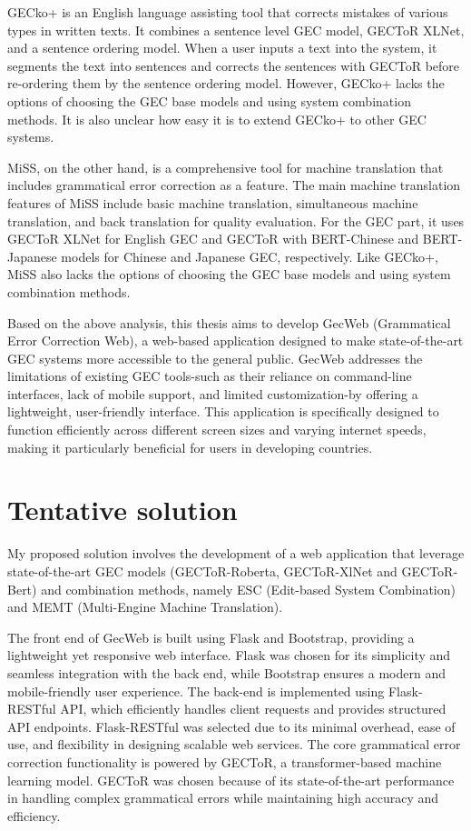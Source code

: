 GECko+ is an English language assisting tool that corrects mistakes of various types in written texts.
It combines a sentence level GEC model, GECToR XLNet, and a sentence ordering model.
When a user inputs a text into the system, it segments the text into sentences and corrects the sentences with GECToR before re-ordering them by the sentence ordering model.
However, GECko+ lacks the options of choosing the GEC base models and using
system combination methods.
It is also unclear how easy it is to extend GECko+ to other GEC systems.

MiSS, on the other hand, is a comprehensive tool for machine translation that includes grammatical error correction as a feature.
The main machine translation features of MiSS include basic machine translation, simultaneous machine translation, and back translation for quality evaluation.
For the GEC part, it uses GECToR XLNet for English GEC and GECToR with BERT-Chinese and BERT-Japanese models for Chinese and Japanese GEC, respectively.
Like GECko+, MiSS also lacks the options of choosing the GEC base models and using system combination methods.

Based on the above analysis, this thesis aims to develop GecWeb (Grammatical Error Correction Web), a web-based application designed to make state-of-the-art GEC systems more accessible to the general public.
GecWeb addresses the limitations of existing GEC tools-such as their reliance on command-line interfaces, lack of mobile support, and limited customization-by offering a lightweight, user-friendly interface.
This application is specifically designed to function efficiently across different screen sizes and varying internet speeds, making it particularly beneficial for users in developing countries.

\section{Tentative solution}
\label{section:tentative}

My proposed solution involves the development of a web application that leverage state-of-the-art GEC models (GECToR-Roberta, GECToR-XlNet and GECToR-Bert) and combination methods, namely ESC (Edit-based System Combination) and MEMT (Multi-Engine Machine Translation).

The front end of GecWeb is built using Flask and Bootstrap, providing a lightweight yet responsive web interface.
Flask was chosen for its simplicity and seamless integration with the back end, while Bootstrap ensures a modern and mobile-friendly user experience.
The back-end is implemented using Flask-RESTful API, which efficiently handles client requests and provides structured API endpoints.
Flask-RESTful was selected due to its minimal overhead, ease of use, and flexibility in designing scalable web services.
The core grammatical error correction functionality is powered by GECToR, a transformer-based machine learning model.
GECToR was chosen because of its state-of-the-art performance in handling complex grammatical errors while maintaining high accuracy and efficiency.


